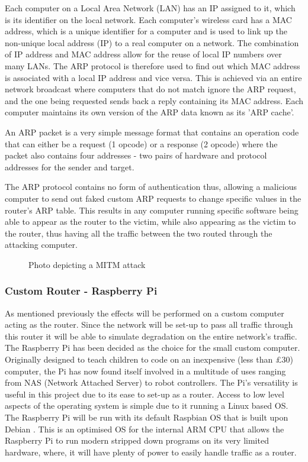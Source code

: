 Each computer on a Local Area Network (LAN) has an IP assigned to it, which is its identifier on the local network. Each computer's wireless card has a MAC address, which is a unique identifier for a computer and is used to link up the non-unique local address (IP) to a real computer on a network. The combination of IP address and MAC address allow for the reuse of local IP numbers over many LANs. The ARP protocol is therefore used to find out which MAC address is associated with a local IP address and vice versa. This is achieved via an entire network broadcast where computers that do not match ignore the ARP request, and the one being requested sends back a reply containing its MAC address. Each computer maintains its own version of the ARP data known as its 'ARP cache'.

An ARP packet is a very simple message format that contains an operation code that can either be a request (1 opcode) or a response (2 opcode) where the packet also contains four addresses - two pairs of hardware and protocol addresses for the sender and target.

The ARP protocol contains no form of authentication thus, allowing a malicious computer to send out faked custom ARP requests to change specific values in the router's ARP table. This results in any computer running specific software being able to appear as the router to the victim, while also appearing as the victim to the router, thus having all the traffic between the two routed through the attacking computer. 

\clearpage
\begin{center}

	\begin{figure}[h]
		\caption{Photo depicting a MITM attack}
	\end{figure}
\end{center}

\subsubsection{Custom Router - Raspberry Pi}
As mentioned previously the effects will be performed on a custom computer acting as the router. Since the network will be set-up to pass all traffic through this router it will be able to simulate degradation on the entire network's traffic.
The Raspberry Pi \citep{upton2014raspberry} has been decided as the choice for the small custom computer. Originally designed to teach children to code on an inexpensive (less than £30) computer, the Pi has now found itself involved in a multitude of uses ranging from NAS (Network Attached Server) to robot controllers. The Pi's versatility is useful in this project due to its ease to set-up as a router. Access to low level aspects of the operating system is simple due to it running a Linux based OS. The Raspberry Pi will be run with its default Raspbian OS \citep{pi2014raspbian} that is built upon Debian \citep{murdock1994overview}. This is an optimised OS for the internal ARM CPU that allows the Raspberry Pi to run modern stripped down programs on its very limited hardware, where, it will have plenty of power to easily handle traffic as a router.



